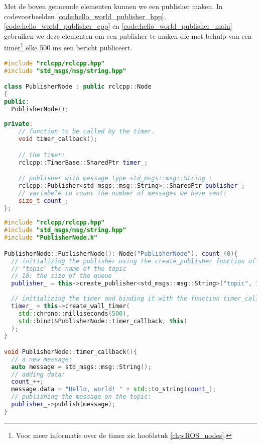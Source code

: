 \noindent Met de boven genoemde elementen kunnen we een publisher maken. In codevoorbeelden \ref{code:hello_world_publisher_hpp}, \ref{code:hello_world_publisher_cpp} en \ref{code:hello_world_publisher_main} gebruiken we deze elementen om een publisher te maken die met behulp van een timer\footnote{Voor meer informatie over de timer zie hoofdstuk \ref{chp:ROS_nodes}.} elke 500 ms een bericht publiceert. 

\begin{lstlisting}[language=C++, caption={PublisherNode.hpp}, firstnumber=0, label={code:hello_world_publisher_hpp}]
#include "rclcpp/rclcpp.hpp"
#include "std_msgs/msg/string.hpp"

class PublisherNode : public rclcpp::Node
{
public:
  PublisherNode();
  
private:
    // function to be called by the timer.
    void timer_callback();

    // the timer:
    rclcpp::TimerBase::SharedPtr timer_;

    // publisher with message type std_msgs::msg::String :
    rclcpp::Publisher<std_msgs::msg::String>::SharedPtr publisher_;
    // variabele to count the number of messages we have sent:
    size_t count_;
};


\end{lstlisting}

\begin{lstlisting}[language=C++, caption={PublisherNode.cpp}, firstnumber=0, label={code:hello_world_publisher_cpp}]
#include "rclcpp/rclcpp.hpp"
#include "std_msgs/msg/string.hpp"
#include "PublisherNode.h"

PublisherNode::PublisherNode(): Node("PublisherNode"), count_(0){
  // initializing the publisher using the create_publisher function of the parent:
  // "topic" the name of the topic
  // 10: the size of the queue
  publisher_ = this->create_publisher<std_msgs::msg::String>("topic", 10);
  
  // initializing the timer and binding it with the function timer_callback():
  timer_ = this->create_wall_timer(
    std::chrono::milliseconds(500), 
    std::bind(&PublisherNode::timer_callback, this)
  );
}

void PublisherNode::timer_callback(){
  // a new message:
  auto message = std_msgs::msg::String();
  // adding data:
  count_++;
  message.data = "Hello, world! " + std::to_string(count_);
  // publishing the message on the topic:
  publisher_->publish(message);
}

\end{lstlisting}


